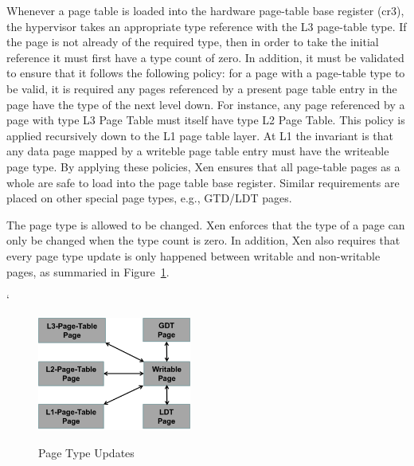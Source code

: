 Whenever a page table is loaded into the hardware page-table base register (cr3), 
the hypervisor takes an appropriate type reference with the L3 page-table type.
If the page is not already of the required type, then in order to take the initial reference it must first have a type count of zero.
In addition, it must be validated to ensure that it follows the following policy: 
for a page with a page-table type to be valid, it is required any pages referenced 
by a present page table entry in the page have the type of the next level down. 
For instance, any page referenced by a page with type L3 Page Table must itself have type L2 Page Table. 
This policy is applied recursively down to the L1 page table layer. 
At L1 the invariant is that any data page mapped by a writeble page table entry must have the writeable page type.
By applying these policies, Xen ensures that all page-table pages as a whole are safe to load into the page table base register.
Similar requirements are placed on other special page types, e.g., GTD/LDT pages.

The page type is allowed to be changed. 
Xen enforces that the type of a page can only be changed when the type count is zero.  
In addition, Xen also requires that every page type update is only happened between writable and non-writable pages, as summaried in Figure~\ref{fig:page-type-updates}.

` 
\begin{figure}[ht]
\centering
\includegraphics[width=0.45\textwidth]{image/background/page-type-updates.png} \\
\caption{Page Type Updates}
\label{fig:page-type-updates}
\end{figure}



